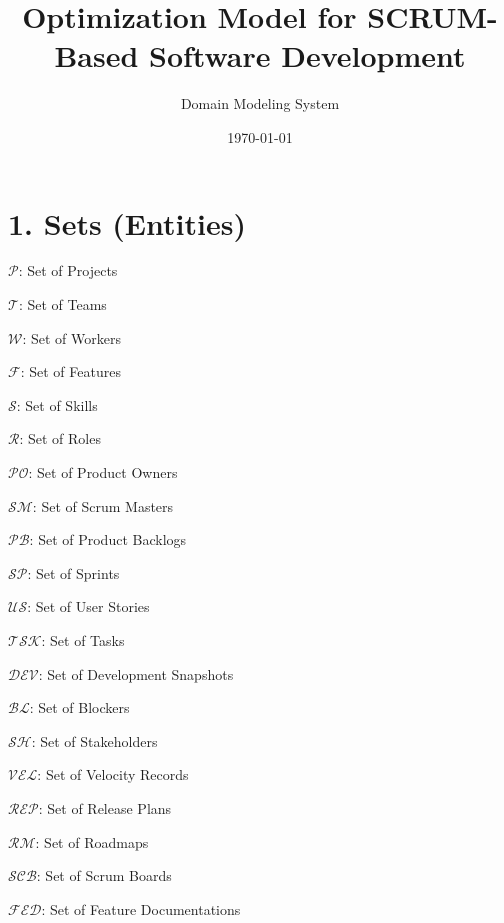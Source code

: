 \documentclass[12pt]{article}
\title{Optimization Model for SCRUM-Based Software Development}
\author{Domain Modeling System}
\date{\today}
\begin{document}
\maketitle
\tableofcontents
\newpage

\section{1. Sets (Entities)}
\item $\mathcal{P}$: Set of Projects
    \item $\mathcal{T}$: Set of Teams
    \item $\mathcal{W}$: Set of Workers
    \item $\mathcal{F}$: Set of Features
    \item $\mathcal{S}$: Set of Skills
    \item $\mathcal{R}$: Set of Roles
    \item $\mathcal{PO}$: Set of Product Owners
    \item $\mathcal{SM}$: Set of Scrum Masters
    \item $\mathcal{PB}$: Set of Product Backlogs
    \item $\mathcal{SP}$: Set of Sprints
    \item $\mathcal{US}$: Set of User Stories
    \item $\mathcal{TSK}$: Set of Tasks
    \item $\mathcal{DEV}$: Set of Development Snapshots
    \item $\mathcal{BL}$: Set of Blockers
    \item $\mathcal{SH}$: Set of Stakeholders
    \item $\mathcal{VEL}$: Set of Velocity Records
    \item $\mathcal{REP}$: Set of Release Plans
    \item $\mathcal{RM}$: Set of Roadmaps
    \item $\mathcal{SCB}$: Set of Scrum Boards
    \item $\mathcal{FED}$: Set of Feature Documentations
\end{document}
